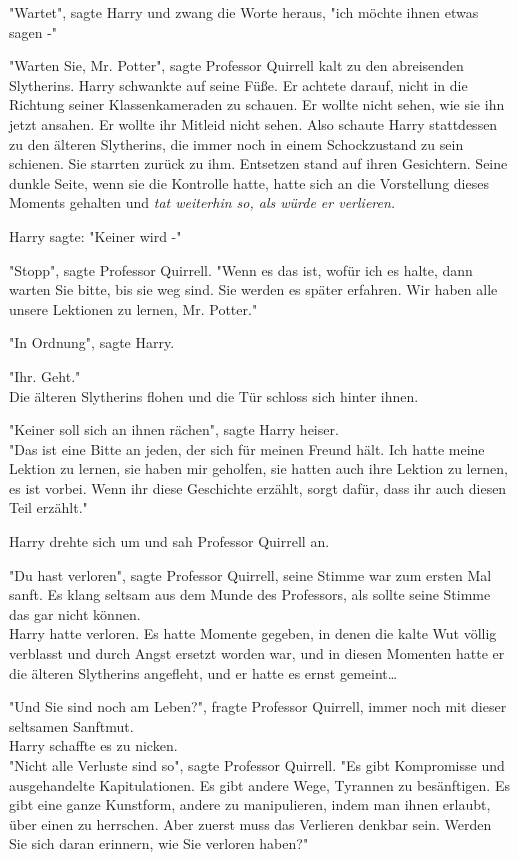 {"Wartet", sagte Harry und zwang die Worte heraus, "ich möchte ihnen etwas sagen -"

"Warten Sie, Mr. Potter", sagte Professor Quirrell kalt zu den abreisenden Slytherins. Harry schwankte auf seine Füße. Er achtete darauf, nicht in die Richtung seiner Klassenkameraden zu schauen. Er wollte nicht sehen, wie sie ihn jetzt ansahen. Er wollte ihr Mitleid nicht sehen. Also schaute Harry stattdessen zu den älteren Slytherins, die immer noch in einem Schockzustand zu sein schienen. Sie starrten zurück zu ihm. Entsetzen stand auf ihren Gesichtern. Seine dunkle Seite, wenn sie die Kontrolle hatte, hatte sich an die Vorstellung dieses Moments gehalten und \emph{tat weiterhin so, als würde er verlieren.}

Harry sagte: "Keiner wird -"

"Stopp", sagte Professor Quirrell. "Wenn es das ist, wofür ich es halte, dann warten Sie bitte, bis sie weg sind. Sie werden es später erfahren. Wir haben alle unsere Lektionen zu lernen, Mr. Potter."

"In Ordnung", sagte Harry.

"Ihr. Geht."\\ Die älteren Slytherins flohen und die Tür schloss sich hinter ihnen.

"Keiner soll sich an ihnen rächen", sagte Harry heiser.\\ "Das ist eine Bitte an jeden, der sich für meinen Freund hält. Ich hatte meine Lektion zu lernen, sie haben mir geholfen, sie hatten auch ihre Lektion zu lernen, es ist vorbei. Wenn ihr diese Geschichte erzählt, sorgt dafür, dass ihr auch diesen Teil erzählt."

Harry drehte sich um und sah Professor Quirrell an.

"Du hast verloren", sagte Professor Quirrell, seine Stimme war zum ersten Mal sanft. Es klang seltsam aus dem Munde des Professors, als sollte seine Stimme das gar nicht können.\\ Harry hatte verloren. Es hatte Momente gegeben, in denen die kalte Wut völlig verblasst und durch Angst ersetzt worden war, und in diesen Momenten hatte er die älteren Slytherins angefleht, und er hatte es ernst gemeint…

"Und Sie sind noch am Leben?", fragte Professor Quirrell, immer noch mit dieser seltsamen Sanftmut.\\ Harry schaffte es zu nicken.\\ "Nicht alle Verluste sind so", sagte Professor Quirrell. "Es gibt Kompromisse und ausgehandelte Kapitulationen. Es gibt andere Wege, Tyrannen zu besänftigen. Es gibt eine ganze Kunstform, andere zu manipulieren, indem man ihnen erlaubt, über einen zu herrschen. Aber zuerst muss das Verlieren denkbar sein. Werden Sie sich daran erinnern, wie Sie verloren haben?"

}
